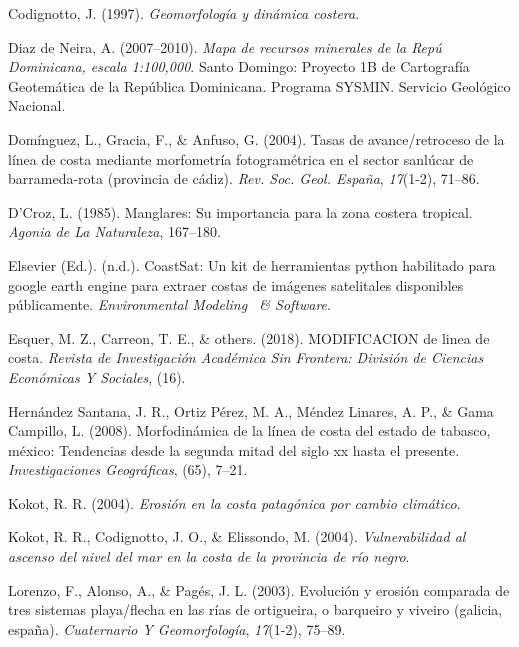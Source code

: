 \documentclass[11pt,]{article}
\begin{document}
\hypertarget{ref-codignotto1997geomorfologia}{}
Codignotto, J. (1997). \emph{Geomorfología y dinámica costera}.

\hypertarget{ref-maparecursosminerales}{}
Diaz de Neira, A. (2007--2010). \emph{Mapa de recursos minerales de la
Repú Dominicana, escala 1:100,000}. Santo Domingo: Proyecto 1B de
Cartografía Geotemática de la República Dominicana. Programa SYSMIN.
Servicio Geológico Nacional.

\hypertarget{ref-dominguez2004tasas}{}
Domínguez, L., Gracia, F., \& Anfuso, G. (2004). Tasas de
avance/retroceso de la línea de costa mediante morfometría
fotogramétrica en el sector sanlúcar de barrameda-rota (provincia de
cádiz). \emph{Rev. Soc. Geol. España}, \emph{17}(1-2), 71--86.

\hypertarget{ref-d1985manglares}{}
D'Croz, L. (1985). Manglares: Su importancia para la zona costera
tropical. \emph{Agonia de La Naturaleza}, 167--180.

\hypertarget{ref-vos2019coastsat}{}
Elsevier (Ed.). (n.d.). CoastSat: Un kit de herramientas python
habilitado para google earth engine para extraer costas de imágenes
satelitales disponibles públicamente. \emph{Environmental Modeling ~\&
Software}.

\hypertarget{ref-esquer2018modificacion}{}
Esquer, M. Z., Carreon, T. E., \& others. (2018). MODIFICACION de linea
de costa. \emph{Revista de Investigación Académica Sin Frontera:
División de Ciencias Económicas Y Sociales}, (16).

\hypertarget{ref-hernandez2008morfodinamica}{}
Hernández Santana, J. R., Ortiz Pérez, M. A., Méndez Linares, A. P., \&
Gama Campillo, L. (2008). Morfodinámica de la línea de costa del estado
de tabasco, méxico: Tendencias desde la segunda mitad del siglo xx hasta
el presente. \emph{Investigaciones Geográficas}, (65), 7--21.

\hypertarget{ref-kokot2004erosion}{}
Kokot, R. R. (2004). \emph{Erosión en la costa patagónica por cambio
climático}.

\hypertarget{ref-kokot2004vulnerabilidad}{}
Kokot, R. R., Codignotto, J. O., \& Elissondo, M. (2004).
\emph{Vulnerabilidad al ascenso del nivel del mar en la costa de la
provincia de río negro}.

\hypertarget{ref-lorenzo2003evolucion}{}
Lorenzo, F., Alonso, A., \& Pagés, J. L. (2003). Evolución y erosión
comparada de tres sistemas playa/flecha en las rías de ortigueira, o
barqueiro y viveiro (galicia, españa). \emph{Cuaternario Y
Geomorfología}, \emph{17}(1-2), 75--89.
\end{document}
